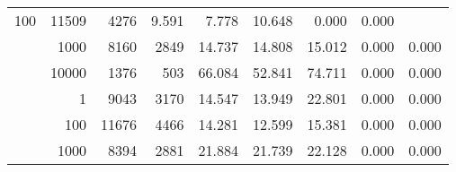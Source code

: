 \begin{table}
\begin{tabular}{rrrrrrrrr}
					\multirow{ 1 }{*}{ 100 } &
					
						
							    
							     11509  & 4276  
	                           & 9.591 & 7.778 & 10.648
	                           & 0.000 & 0.000  \\
	                
	            
					 &  
					 
					\multirow{ 1 }{*}{ 1000 } &
					
						
							    
							     8160  & 2849  
	                           & 14.737 & 14.808 & 15.012
	                           & 0.000 & 0.000  \\
	                
	            
					 &  
					 
					\multirow{ 1 }{*}{ 10000 } &
					
						
							    
							     1376  & 503  
	                           & 66.084 & 52.841 & 74.711
	                           & 0.000 & 0.000  \\
	                
	            
	        
				\noalign{\smallskip}\hline
				\multirow{ 4 }{*}{ 250000 } &
				
					
					 
					\multirow{ 1 }{*}{ 1 } &
					
						
							    
							     9043  & 3170  
	                           & 14.547 & 13.949 & 22.801
	                           & 0.000 & 0.000  \\
	                
	            
					 &  
					 
					\multirow{ 1 }{*}{ 100 } &
					
						
							    
							     11676  & 4466  
	                           & 14.281 & 12.599 & 15.381
	                           & 0.000 & 0.000  \\
	                
	            
					 &  
					 
					\multirow{ 1 }{*}{ 1000 } &
					
						
							    
							     8394  & 2881  
	                           & 21.884 & 21.739 & 22.128
	                           & 0.000 & 0.000  \\
	                

\end{tabular}
\end{table}
